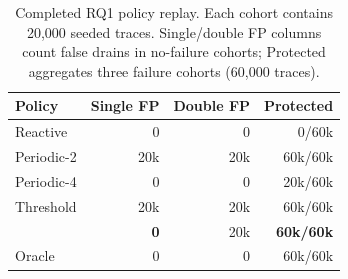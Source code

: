 \begin{table}[t]
  \centering
  \scriptsize
  \caption{Completed RQ1 policy replay. Each cohort contains 20,000 seeded traces. Single/double FP columns count false drains in no-failure cohorts; Protected aggregates three failure cohorts (60,000 traces).}
  \label{tab:rq1-results}
  \begin{tabular}{@{}lrrr@{}}
    \toprule
    Policy & Single FP & Double FP & Protected \\
    \midrule
    Reactive & 0 & 0 & 0/60k \\
    Periodic-2 & 20k & 20k & 60k/60k \\
    Periodic-4 & 0 & 0 & 20k/60k \\
    Threshold & 20k & 20k & 60k/60k \\
    \autopilot{} & \textbf{0} & 20k & \textbf{60k/60k} \\
    Oracle & 0 & 0 & 60k/60k \\
    \bottomrule
  \end{tabular}
\end{table}
